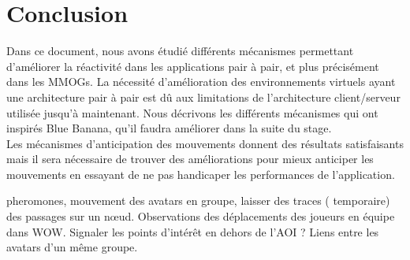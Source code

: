 \section{Conclusion}
	Dans ce document, nous avons étudié différents mécanismes permettant d'améliorer la réactivité dans les applications pair à pair, et plus précisément dans les MMOGs. La nécessité d'amélioration des environnements virtuels ayant une architecture pair à pair est dû aux limitations de l'architecture client/serveur utilisée jusqu'à maintenant. Nous décrivons les différents mécanismes qui ont inspirés Blue Banana, qu'il faudra améliorer dans la suite du stage.\\
	Les mécanismes d'anticipation des mouvements donnent des résultats satisfaisants mais il sera nécessaire de trouver des améliorations pour mieux anticiper les mouvements en essayant de ne pas handicaper les performances de l'application.

	pheromones, mouvement des avatars en groupe, laisser des traces ( temporaire) des passages sur un nœud. Observations des déplacements des joueurs en équipe dans WOW.
		Signaler les points d'intérêt en dehors de l'AOI ? 
		Liens entre les avatars d'un même groupe.	
		
